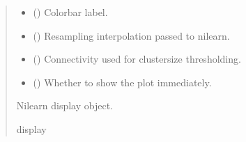 \documentclass[letterpaper,10pt,english]{sphinxhowto}
\begin{document}
\begin{fulllineitems}
\begin{quote}
\begin{description}
\begin{itemize}
\item {} 
\sphinxAtStartPar
{} (\sphinxstyleliteralemphasis{\sphinxupquote{, }}) \textendash{} Colorbar label.

\item {} 
\sphinxAtStartPar
{} (\sphinxstyleliteralemphasis{\sphinxupquote{, }}) \textendash{} Resampling interpolation passed to nilearn.

\item {} 
\sphinxAtStartPar
{} (\sphinxstyleliteralemphasis{\sphinxupquote{, }}) \textendash{} Connectivity used for cluster\sphinxhyphen{}size thresholding.

\item {} 
\sphinxAtStartPar
{} (\sphinxstyleliteralemphasis{\sphinxupquote{, }}) \textendash{} Whether to show the plot immediately.

\end{itemize}

\sphinxAtStartPar
Nilearn display object.

\sphinxAtStartPar
display

\end{description}\end{quote}

\end{fulllineitems}

\end{document}

